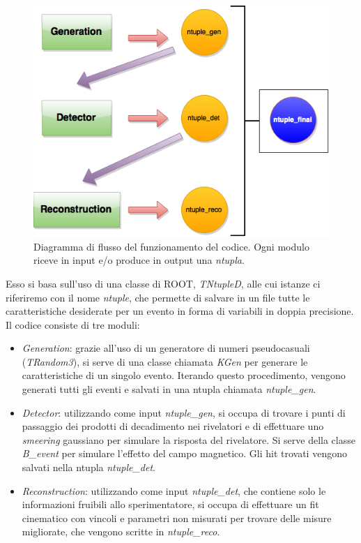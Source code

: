 \documentclass[8pt]{extarticle}
\begin{document}
\begin{figure}
	\begin{center}
		\includegraphics[scale=0.4]{script_structure}
		\caption{Diagramma di flusso del funzionamento del codice. Ogni modulo riceve in input e/o produce in output una \textit{ntupla}.}
		\label{fig:script_structure}
	\end{center}
\end{figure}

Esso si basa sull'uso di una classe di ROOT, \textit{TNtupleD},  alle cui istanze ci riferiremo con il nome \textit{ntuple}, che permette di salvare in un file tutte le caratteristiche desiderate per un evento in forma di variabili in doppia precisione. \\

Il codice consiste di tre moduli: \\
\begin{itemize}
\item \textit{Generation}: grazie all'uso di un generatore di numeri pseudocasuali (\textit{TRandom3}), si serve di una classe chiamata \textit{KGen} per generare le caratteristiche di un singolo evento. Iterando questo procedimento, vengono generati tutti gli eventi e salvati in una ntupla chiamata \textit{ntuple\_gen}.
\item \textit{Detector}: utilizzando come input \textit{ntuple\_gen}, si occupa di trovare i punti di passaggio dei prodotti di decadimento nei rivelatori e di effettuare uno \textit{smeering} gaussiano per simulare la risposta del rivelatore. Si serve della classe \textit{B\_event} per simulare l'effetto del campo magnetico. Gli hit trovati vengono salvati nella ntupla \textit{ntuple\_det}.
\item \textit{Reconstruction}: utilizzando come input \textit{ntuple\_det}, che contiene solo le informazioni fruibili allo sperimentatore, si occupa di effettuare un fit cinematico con vincoli e parametri non misurati per trovare delle misure migliorate, che vengono scritte in \textit{ntuple\_reco}.
\end{itemize}
\end{document}
